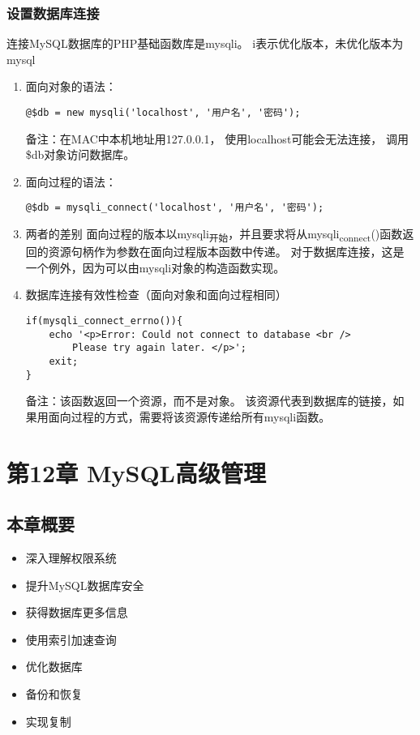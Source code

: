 \documentclass[11pt]{article}
\begin{document}
\subsubsection{设置数据库连接}
\label{sec:org5c764b3}
连接MySQL数据库的PHP基础函数库是mysqli。 i表示优化版本，未优化版本为mysql
\begin{enumerate}
\item 面向对象的语法：
\label{sec:orga2b4983}
\begin{verbatim}
@$db = new mysqli('localhost', '用户名', '密码');
\end{verbatim}
备注：在MAC中本机地址用127.0.0.1， 使用localhost可能会无法连接， 调用\$db对象访问数据库。
\item 面向过程的语法：
\label{sec:orgf94dc8a}
\begin{verbatim}
@$db = mysqli_connect('localhost', '用户名', '密码');
\end{verbatim}
\item 两者的差别
\label{sec:orgede0f5b}
面向过程的版本以mysqli\textsubscript{开始}，并且要求将从mysqli\textsubscript{connect}()函数返回的资源句柄作为参数在面向过程版本函数中传递。 对于数据库连接，这是一个例外，因为可以由mysqli对象的构造函数实现。
\item 数据库连接有效性检查（面向对象和面向过程相同）
\label{sec:org7ed17ac}
\begin{verbatim}
if(mysqli_connect_errno()){
    echo '<p>Error: Could not connect to database <br />
	    Please try again later. </p>';
    exit;
}
\end{verbatim}
备注：该函数返回一个资源，而不是对象。 该资源代表到数据库的链接，如果用面向过程的方式，需要将该资源传递给所有mysqli函数。
\end{enumerate}
\section{第12章 MySQL高级管理}
\label{sec:orgb5f9544}
\subsection{本章概要}
\label{sec:org62c9cbd}
\begin{itemize}
\item 深入理解权限系统
\item 提升MySQL数据库安全
\item 获得数据库更多信息
\item 使用索引加速查询
\item 优化数据库
\item 备份和恢复
\item 实现复制
\end{itemize}
\end{document}
